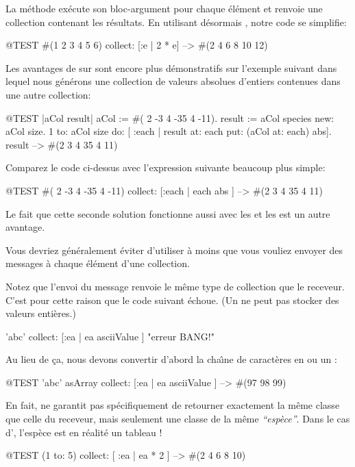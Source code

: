 \documentclass[a4paper,10pt,twoside]{book}
\begin{document}
\noindent
La m\'ethode  ex\'ecute son bloc-argument
pour chaque \'el\'ement et renvoie une collection contenant les r\'esultats.
En utilisant d\'esormais , notre code se simplifie:
\begin{code}{@TEST}
#(1 2 3 4 5 6) collect: [:e | 2 * e] --> #(2 4 6 8 10 12)
\end{code}

Les avantages de  sur  sont encore
plus d\'emonstratifs sur l'exemple suivant dans lequel nous g\'en\'erons
une collection de valeurs absolues d'entiers contenues dans une autre
collection:

\begin{code}{@TEST |aCol result|}
aCol :=  #( 2 -3 4 -35 4 -11).
result := aCol species new: aCol size.
1 to: aCol size do: [ :each | result at: each put: (aCol at: each) abs].
result --> #(2 3 4 35 4 11)
\end{code}
\noindent
Comparez le code ci-dessus avec l'expression suivante beaucoup plus simple:
\begin{code}{@TEST}
#( 2 -3 4 -35 4 -11) collect: [:each | each abs ] --> #(2 3 4 35 4 11)
\end{code}
\noindent
Le fait que cette seconde solution fonctionne aussi avec les  et les  est un autre avantage.

Vous devriez g\'en\'eralement \'eviter d'utiliser  \`a moins que 
vous vouliez envoyer des messages \`a chaque \'el\'ement d'une collection.

Notez que l'envoi du message  renvoie le m\^eme type de collection
que le receveur.
C'est pour cette raison que le code suivant \'echoue.
(Un  ne peut pas stocker des valeurs enti\`eres.)
\begin{code}{}
'abc' collect: [:ea | ea asciiValue ]      "erreur BANG!"
\end{code}
\noindent
Au lieu de \c{c}a, nous devons convertir d'abord la cha\^{\i}ne de caract\`eres
en  ou un :
\begin{code}{@TEST}
'abc' asArray collect: [:ea | ea asciiValue ] --> #(97 98 99)
\end{code}

En fait,  ne garantit pas sp\'ecifiquement de retourner 
exactement la m\^eme classe que celle du receveur, mais seulement une classe
de la m\^eme \emph{``esp\`ece''}.  Dans le cas d', l'esp\`ece est en r\'ealit\'e un tableau !
\begin{code}{@TEST}
(1 to: 5) collect: [ :ea | ea * 2 ] --> #(2 4 6 8 10)
\end{code}
\end{document}

